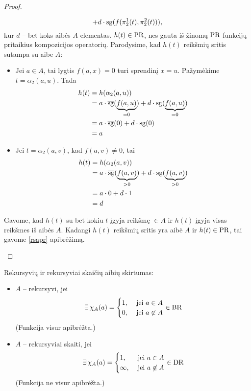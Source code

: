 \begin{prop}
\begin{proof}
\begin{description}
\[        + d \cdot \operatorname{sg}(f(\pi^{1}_{2}(t), \pi_{2}^{2}(t))), 
        \]
        kur $d$ – bet koks aibės $A$ elementas. $h(t) \in \mathop{\text{PR}}$, nes gauta
        iš žinomų $\mathop{\text{PR}}$ funkcijų pritaikius kompozicijos operatorių.
        Parodysime, kad $h(t)$ reikšmių sritis sutampa su aibe $A$:
        \begin{itemize}
          \item Jei $a \in A$, tai lygtis $f(a,x) = 0$ turi sprendinį
            $x = u$. Pažymėkime $t = \alpha_{2}(a, u)$. Tada
            \begin{align*}
              h(t) &= h(\alpha_{2}(a, u)) \\
              &= a \cdot \sgi(\underbrace{f(a, u)}_{= 0}) + %
                d \cdot \sg(\underbrace{f(a, u)}_{= 0}) \\
              &= a \cdot \sgi(0) + d \cdot \sg(0) \\
              &= a
            \end{align*}
          \item Jei $t = \alpha_{2}(a, v)$, kad $f(a, v) \neq 0$, tai
            \begin{align*}
              h(t) &= h(\alpha_{2}(a, v)) \\
              &= a \cdot \sgi(\underbrace{f(a, v)}_{> 0}) + %
                d \cdot \sg(\underbrace{f(a, v)}_{> 0}) \\
              &= a \cdot 0 + d \cdot 1 \\
              &= d
            \end{align*}
        \end{itemize}
        Gavome, kad $h(t)$ su bet kokiu $t$ įgyja reikšmę $\in A$ ir 
        $h(t)$ įgyja visas reikšmes iš aibės $A$. Kadangi 
        $h(t)$ reikšmių sritis yra aibė $A$ ir $h(t) \in \mathop{\text{PR}}$, tai
        gavome \ref{rsapr} apibrėžimą.
    \end{description}
  \end{proof}
\end{prop}

\begin{note}
  Rekursyvių ir rekursyviai skaičių aibių skirtumas:
  \begin{itemize}
    \item $A$ – rekursyvi, jei 
      \[
      \exists \, \chi_{A}(a) =%
      \begin{cases}
        1, & \text{ jei } a \in A \\
        0, & \text{ jei } a \not \in A
      \end{cases}%
      \in \BR
      \]
      (Funkcija visur apibrėžta.)
    \item $A$ – rekursyviai skaiti, jei
      \[
      \exists \, \chi_{A}(a) =%
      \begin{cases}
        1, & \text{ jei } a \in A \\
        \infty, & \text{ jei } a \not \in A
      \end{cases}%
      \in \DR
      \]
      (Funkcija ne visur apibrėžta.)
  \end{itemize}
\end{note}

